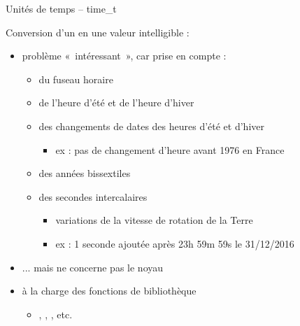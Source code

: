 \begin {frame} {Unités de temps -- time\_t}

    Conversion d'un  en une valeur intelligible :
    \begin {itemize}
	\item problème «~intéressant~», car prise en compte :
	    \begin {itemize}
		\item du fuseau horaire
		\item de l'heure d'été et de l'heure d'hiver
		\item des changements de dates des heures d'été et d'hiver
		    \begin {itemize}
			\item ex : pas de changement d'heure avant 1976
			    en France
		    \end {itemize}
		\item des années bissextiles
		\item des secondes intercalaires
		    \begin {itemize}
			\item variations de la vitesse de rotation de la Terre
			\item ex : 1 seconde ajoutée après 23h 59m 59s
			    le 31/12/2016
		    \end {itemize}
	    \end {itemize}

	\item ... mais ne concerne pas le noyau
	\item \implique à la charge des fonctions de bibliothèque
	    \begin {itemize}
		\item {}, , , etc.
	    \end {itemize}

    \end {itemize}
\end {frame}

